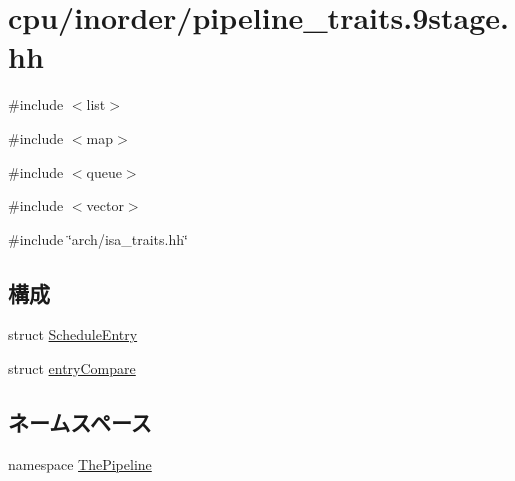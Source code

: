 \hypertarget{pipeline__traits_89stage_8hh}{
\section{cpu/inorder/pipeline\_\-traits.9stage.hh}
\label{pipeline__traits_89stage_8hh}
}
{\ttfamily \#include $<$list$>$}\par
{\ttfamily \#include $<$map$>$}\par
{\ttfamily \#include $<$queue$>$}\par
{\ttfamily \#include $<$vector$>$}\par
{\ttfamily \#include \char`\"{}arch/isa\_\-traits.hh\char`\"{}}\par
\subsection*{構成}
\begin{DoxyCompactItemize}
\item 
struct \hyperlink{structThePipeline_1_1ScheduleEntry}{ScheduleEntry}
\item 
struct \hyperlink{structThePipeline_1_1entryCompare}{entryCompare}
\end{DoxyCompactItemize}
\subsection*{ネームスペース}
\begin{DoxyCompactItemize}
\item 
namespace \hyperlink{namespaceThePipeline}{ThePipeline}
\end{DoxyCompactItemize}
